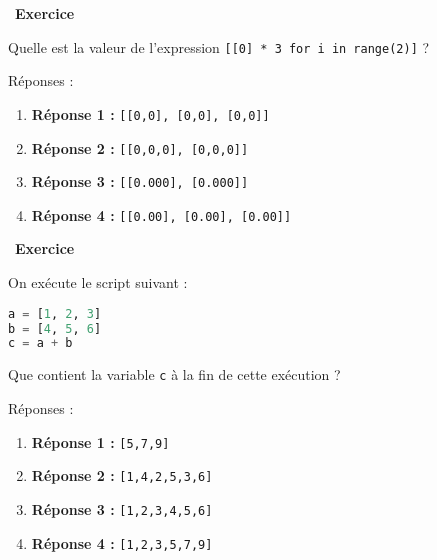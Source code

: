 \documentclass[
  11pt,
]{article}
\newcommand{\passthrough}[1]{#1}
\providecommand{\tightlist}{%
  \setlength{\itemsep}{0pt}\setlength{\parskip}{0pt}}
\newcounter{exo}
\newenvironment{exercice}[1]
{\par \medskip   \addtocounter{exo}{1} \noindent  
\begin{bclogo}[arrondi =0.1,   noborder = true, logo=\bccrayon, marge=4]{~\textbf{Exercice} \textbf{\theexo} {\itshape #1} }  \par}
{
\end{bclogo}
 \par \bigskip }
\newcounter{def}
\begin{document}
\begin{exercice}{}

Quelle est la valeur de l'expression
\passthrough{\lstinline![[0] * 3 for i in range(2)]!} ?

Réponses :

\begin{enumerate}
\def\labelenumi{\arabic{enumi}.}
\tightlist
\item
  \textbf{Réponse 1 :} \passthrough{\lstinline![[0,0], [0,0], [0,0]]!}
\item
  \textbf{Réponse 2 :} \passthrough{\lstinline![[0,0,0], [0,0,0]]!}
\item
  \textbf{Réponse 3 :} \passthrough{\lstinline![[0.000], [0.000]]!}
\item
  \textbf{Réponse 4 :}
  \passthrough{\lstinline![[0.00], [0.00], [0.00]]!}
\end{enumerate}

\end{exercice}

\begin{exercice}{}

On exécute le script suivant :

\begin{lstlisting}[language=Python]
a = [1, 2, 3]
b = [4, 5, 6]
c = a + b
\end{lstlisting}

Que contient la variable \passthrough{\lstinline!c!} à la fin de cette
exécution ?

Réponses :

\begin{enumerate}
\def\labelenumi{\arabic{enumi}.}
\item
  \textbf{Réponse 1 :} \passthrough{\lstinline![5,7,9]!}
\item
  \textbf{Réponse 2 :} \passthrough{\lstinline![1,4,2,5,3,6]!}
\item
  \textbf{Réponse 3 :} \passthrough{\lstinline![1,2,3,4,5,6]!}
\item
  \textbf{Réponse 4 :} \passthrough{\lstinline![1,2,3,5,7,9]!}
\end{enumerate}

\end{exercice}
\end{document}
